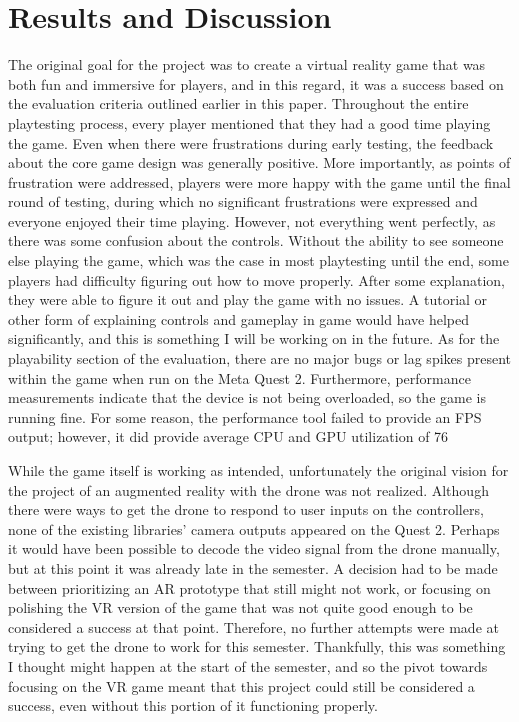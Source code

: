 \documentclass[10pt,twocolumn]{article}
\begin{document}
\section{Results and Discussion}
The original goal for the project was to create a virtual reality game that was both fun and immersive for players, and in this regard, it was a success based on the evaluation criteria outlined earlier in this paper. Throughout the entire playtesting process, every player mentioned that they had a good time playing the game. Even when there were frustrations during early testing, the feedback about the core game design was generally positive. More importantly, as points of frustration were addressed, players were more happy with the game until the final round of testing, during which no significant frustrations were expressed and everyone enjoyed their time playing. However, not everything went perfectly, as there was some confusion about the controls. Without the ability to see someone else playing the game, which was the case in most playtesting until the end, some players had difficulty figuring out how to move properly. After some explanation, they were able to figure it out and play the game with no issues. A tutorial or other form of explaining controls and gameplay in game would have helped significantly, and this is something I will be working on in the future. As for the playability section of the evaluation, there are no major bugs or lag spikes present within the game when run on the Meta Quest 2. Furthermore, performance measurements indicate that the device is not being overloaded, so the game is running fine. For some reason, the performance tool failed to provide an FPS output; however, it did provide average CPU and GPU utilization of 76%

While the game itself is working as intended, unfortunately the original vision for the project of an augmented reality with the drone was not realized. Although there were ways to get the drone to respond to user inputs on the controllers, none of the existing libraries' camera outputs appeared on the Quest 2. Perhaps it would have been possible to decode the video signal from the drone manually, but at this point it was already late in the semester. A decision had to be made between prioritizing an AR prototype that still might not work, or focusing on polishing the VR version of the game that was not quite good enough to be considered a success at that point. Therefore, no further attempts were made at trying to get the drone to work for this semester. Thankfully, this was something I thought might happen at the start of the semester, and so the pivot towards focusing on the VR game meant that this project could still be considered a success, even without this portion of it functioning properly.
\end{document}
